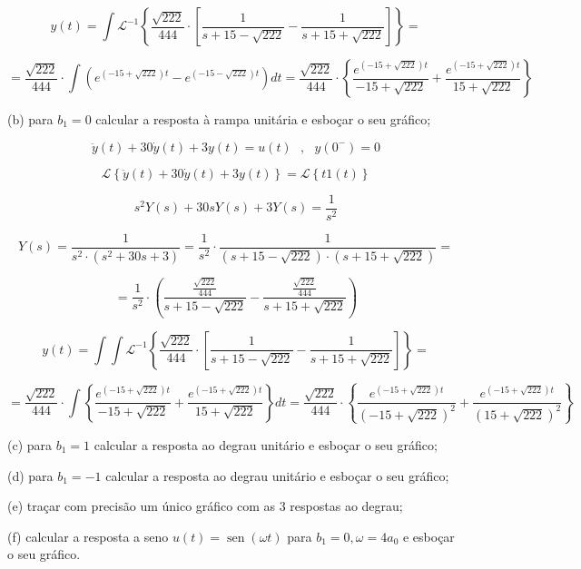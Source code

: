 \documentclass{article}
\DeclareMathOperator{\sen}{sen}
\begin{document}
\[ y(t) = \int \mathcal{L}^{-1} \left\{\frac{\sqrt{222}}{444} \cdot \left[ \frac{1}{s + 15 - \sqrt{222}} - \frac{1}{s + 15 + \sqrt{222}} \right] \right\} = \]

\[ = \frac{\sqrt{222}}{444} \cdot \int (e^{(-15+\sqrt{222})t} - e^{(-15-\sqrt{222})t}) dt = \frac{\sqrt{222}}{444} \cdot \left\{ \frac{e^{(-15+\sqrt{222})t}}{-15+\sqrt{222}} + \frac{e^{(-15+\sqrt{222})t}}{15+\sqrt{222}} \right\}  \]

\vspace{\baselineskip}

(b) para $b_1 = 0$ calcular a resposta à rampa unitária e esboçar o seu gráfico;

\vspace{\baselineskip}

\[\ddot{y}(t) + 30\dot{y}(t) + 3y(t) = u(t)\,\,\,\,,\,\,\,\,y(0^{-}) = 0\]

\[\mathcal{L} \left\{\ddot{y}(t) + 30\dot{y}(t) + 3y(t)\right\} = \mathcal{L} \left\{t1(t)\right\}\]

\[ s^{2}Y(s) + 30sY(s) + 3Y(s) = \frac{1}{s^{2}} \]

\[ Y(s) = \frac{1}{s^{2} \cdot (s^{2} + 30s + 3)} = \frac{1}{s^{2}} \cdot \frac{1}{(s + 15 - \sqrt{222}) \cdot (s + 15 + \sqrt{222})} =\]

\[ = \frac{1}{s^{2}} \cdot \left(\frac{ \frac{\sqrt{222}}{444}}{s + 15 - \sqrt{222}} - \frac{\frac{\sqrt{222}}{444}}{s + 15 + \sqrt{222}}\right) \]

\[ y(t) = \int \int \mathcal{L}^{-1} \left\{\frac{\sqrt{222}}{444} \cdot \left[ \frac{1}{s + 15 - \sqrt{222}} - \frac{1}{s + 15 + \sqrt{222}} \right] \right\} = \]

\[ = \frac{\sqrt{222}}{444} \cdot \int \left\{ \frac{e^{(-15+\sqrt{222})t}}{-15+\sqrt{222}} + \frac{e^{(-15+\sqrt{222})t}}{15+\sqrt{222}} \right\} dt = \frac{\sqrt{222}}{444} \cdot \left\{ \frac{e^{(-15+\sqrt{222})t}}{(-15+\sqrt{222})^{2}} + \frac{e^{(-15+\sqrt{222})t}}{(15+\sqrt{222})^{2}} \right\} \]

\vspace{\baselineskip}

(c) para $b_1 = 1$ calcular a resposta ao degrau unitário e esboçar o seu gráfico;

(d) para $b_1 = -1$ calcular a resposta ao degrau unitário e esboçar o seu gráfico;

(e) traçar com precisão um único gráfico com as 3 respostas ao degrau;

(f) calcular a resposta a seno $u(t) = \sen(\omega t)$ para $b_1 = 0, \omega = 4a_0$ e esboçar o seu gráfico.
\end{document}
